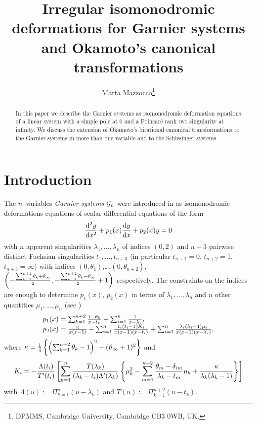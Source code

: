 \documentclass[12pt]{article}
\def\thi{{\vartheta_\infty}}
\theoremstyle{definition}
\theoremstyle{theorem}
\begin{document}
\title{\bf Irregular isomonodromic deformations for Garnier systems
and Okamoto's canonical transformations}
\author{Marta Mazzocco\thanks{DPMMS, Cambridge University,
Cambridge CB3 0WB, UK.}} 
\date{}
\maketitle


\begin{abstract}
In this paper we describe the Garnier systems as isomonodromic deformation
equations of a linear system with a simple pole at $0$ and a Poincar\'e rank 
two singularity at infinity. We discuss the 
extension of Okamoto's birational canonical transformations to the 
Garnier systems in more than one variable and to the Schlesinger systems.
\end{abstract}

\section{Introduction}
The $n$--variables {\it Garnier systems}\/ ${\cal G}_n$ were introduced in
\cite{Gar1,Gar2}
as isomonodromic deformations equations of scalar differential equations
of the form
\begin{equation}
{{\rm d}^2y\over{\rm d}x^2}+p_1(x){{\rm d}y\over{\rm d}x}+p_2(x)y=0
\label{scal}\end{equation}
with $n$ apparent singularities $\lambda_1,\dots,\lambda_n$ of indices $(0,2)$ 
and $n+3$ pairwise distinct Fuchsian singularities 
$t_1,\dots,t_{n+3}$ (in particular $t_{n+1}=0$, $t_{n+2}=1$, 
$t_{n+3}=\infty$) with indices $(0,\theta_1)$,\dots,$(0,\theta_{n+2})$,
$\left(-{\sum_{k=1}^{n+2}\theta_k +\theta_\infty\over2}, 
-{\sum_{k=1}^{n+2}\theta_k -\theta_\infty\over2}+1\right)$ respectively.
The constraints on the indices are enough to determine $p_1(x)$, $p_2(x)$
in terms of  $\lambda_1,\dots,\lambda_n$ and $n$ other quantities 
$\mu_1,\dots,\mu_n$ (see \cite{IKSY})
\begin{equation}
\begin{array}{l}
p_1(x)=\sum_{k=1}^{n+2}{1-\theta_k\over x-t_k}-
\sum_{i=1}^{n}{1\over x-\lambda_i},\\
p_2(x)={\kappa\over x(x-1)}
-\sum_{i=1}^{n}{t_i(t_i-1)K_i\over x(x-1)(x-t_i)}+
\sum_{i=1}^{n}{\lambda_i(\lambda_i-1)\mu_i\over x(x-1)(x-\lambda_i)},\\
\end{array}
\label{scal1}\end{equation}
where $\kappa={1\over4}\left\{ \left(
\sum_{k=1}^{n+2}\theta_k-1\right)^2-(\thi+1)^2\right\}$ and 
\begin{equation}
K_i=-{\Lambda(t_i)\over T'(t_i)}\left[\sum_{k=1}^{n}
{T(\lambda_k)\over(\lambda_k-t_i)\Lambda'(\lambda_k)}
\left\{\mu_k^2-
\sum_{m=1}^{n+2}{\theta_m-\delta_{im}\over\lambda_k-t_m}\mu_k
+{\kappa\over\lambda_k(\lambda_k-1)}\right\}\right]
\label{ham}\end{equation}
with
$\Lambda(u):=\Pi_{k=1}^{n}(u-\lambda_k)$ and
$T(u):=\Pi_{k=1}^{n+2}(u-t_k)$.
\end{document}
